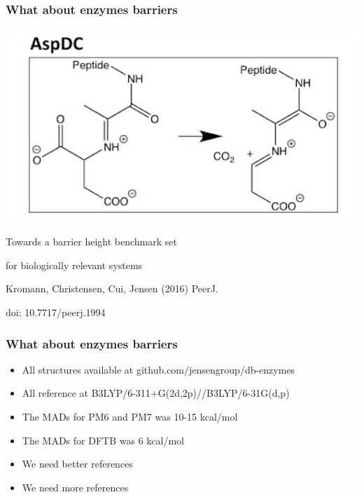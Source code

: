 \begin{frame}[fragile]
    \frametitle{What about enzymes barriers}
    


    \begin{center}

        \includegraphics[width=0.5\linewidth]{images/enzymes.png}

        \small

        Towards a barrier height benchmark set
    
        for biologically relevant systems

    \end{center}

    \bigskip

    \centering

    Kromann, Christensen, Cui, Jensen (2016) PeerJ.
    
    doi: 10.7717/peerj.1994


\end{frame}

\begin{frame}[fragile]
    \frametitle{What about enzymes barriers}

    \bigskip

    \small

    \begin{itemize}
        \item All structures available at github.com/jensengroup/db-enzymes
        \item All reference at B3LYP/6-311+G(2d,2p)//B3LYP/6-31G(d,p)
        \item The MADs for PM6 and PM7 was 10-15 kcal/mol
        \item The MADs for DFTB was 6 kcal/mol
    \end{itemize}

    \begin{itemize}
        \item We need better references
        \item We need more references
    \end{itemize}

\end{frame}


